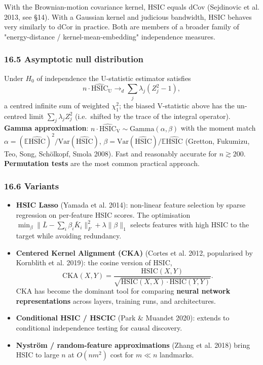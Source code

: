 \documentclass{article}
\providecommand{\tightlist}{\setlength{\itemsep}{0pt}\setlength{\parskip}{0pt}}
\begin{document}
With the Brownian-motion covariance kernel, HSIC equals dCov (Sejdinovic
et al. 2013, see §14). With a Gaussian kernel and judicious bandwidth,
HSIC behaves very similarly to dCor in practice. Both are members of a
broader family of "energy-distance / kernel-mean-embedding" independence
measures.

\subsubsection{16.5 Asymptotic null
distribution}\label{165-asymptotic-null-distribution}

Under \(H_0\) of independence the U-statistic estimator satisfies
\[
n \cdot \widehat{\mathrm{HSIC}}_{\mathrm{U}} \to_d \sum_{j} \lambda_j (Z_j^2 - 1),
\]
a centred infinite sum of weighted \(\chi^2_1\); the biased V-statistic
above has the un-centred limit \(\sum_j \lambda_j Z_j^2\) (i.e.\
shifted by the trace of the integral operator). \textbf{Gamma
approximation}: \(n \cdot \widehat{\mathrm{HSIC}}_{\mathrm{V}} \sim \mathrm{Gamma}(\alpha, \beta)\)
with the moment match \(\alpha = (\mathbb{E}\widehat{\mathrm{HSIC}})^2 / \mathrm{Var}(\widehat{\mathrm{HSIC}})\),
\(\beta = \mathrm{Var}(\widehat{\mathrm{HSIC}}) / \mathbb{E}\widehat{\mathrm{HSIC}}\)
(Gretton, Fukumizu, Teo, Song, Schölkopf, Smola 2008). Fast and
reasonably accurate for \(n \gtrsim 200\). \textbf{Permutation tests}
are the most common practical approach.

\subsubsection{16.6 Variants}\label{166-variants}

\begin{itemize}
\tightlist
\item
  \textbf{HSIC Lasso} (Yamada et al. 2014): non-linear feature selection
  by sparse regression on per-feature HSIC scores. The optimisation
  \(\min_\beta \|\bar{L} - \sum_i \beta_i \bar{K}_i\|_F^2 + \lambda \|\beta\|_1\)
  selects features with high HSIC to the target while avoiding
  redundancy.
\item
  \textbf{Centered Kernel Alignment (CKA)} (Cortes et al. 2012,
  popularised by Kornblith et al. 2019): the cosine version of HSIC, \[
  \mathrm{CKA}(X, Y) = \frac{\mathrm{HSIC}(X, Y)}{\sqrt{\mathrm{HSIC}(X, X) \cdot \mathrm{HSIC}(Y, Y)}}.
  \] CKA has become the dominant tool for comparing \textbf{neural
  network representations} across layers, training runs, and
  architectures.
\item
  \textbf{Conditional HSIC / HSCIC} (Park \& Muandet 2020): extends to
  conditional independence testing for causal discovery.
\item
  \textbf{Nyström / random-feature approximations} (Zhang et al. 2018)
  bring HSIC to large \(n\) at \(O(n m^2)\) cost for \(m \ll n\)
  landmarks.
\end{itemize}
\end{document}
